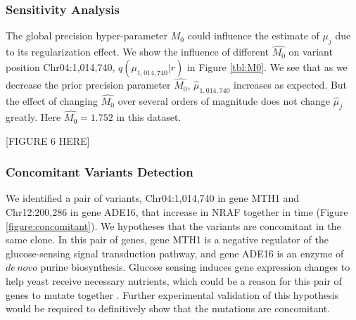 \documentclass{bmcart}
\begin{document}
\subsubsection{Sensitivity Analysis}
The global precision hyper-parameter $M_0$ could influence the estimate of $\mu_j$ due to its regularization effect.
We show the influence of different $\hat{M_0}$ on variant position Chr04:1,014,740, $q(\mu_{1,014,740}|r)$ in Figure \ref{tbl:M0}.
We see that as we decrease the prior precision parameter $\hat{M_0}$, $\hat{\mu}_{1,014,740}$ increases as expected.
But the effect of changing $\hat{M_0}$ over several orders of magnitude does not change $\hat{\mu}_j$ greatly.
Here $\hat{M_0} = 1.752$ in this dataset.

\vspace{2em}
\begin{center}
[FIGURE 6 HERE]  
\end{center}
\vspace{2em}


\subsubsection{Concomitant Variants Detection}
We identified a pair of variants, Chr04:1,014,740 in gene MTH1 and Chr12:200,286 in gene ADE16, that increase in NRAF together in time (Figure \ref{figure:concomitant}).
We hypotheses that the variants are concomitant in the same clone.
In this pair of genes, gene MTH1 is a negative regulator of the glucose-sensing signal transduction pathway, and gene ADE16 is an enzyme of $\mathit{de\, novo}$ purine biosynthesis.
Glucose sensing induces gene expression changes to help yeast receive necessary nutrients, which could be a reason for this pair of genes to mutate together \cite{johnston1999feasting}.
Further experimental validation of this hypothesis would be required to definitively show that the mutations are concomitant.
\end{document}

